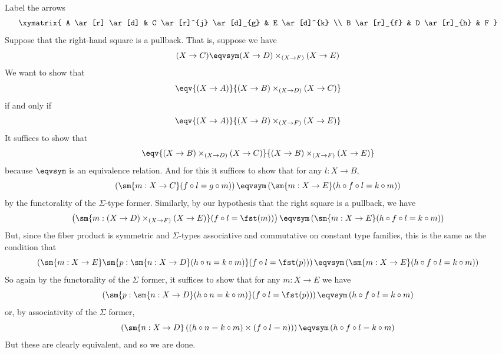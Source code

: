  \soln
Label the arrows
\[\xymatrix{
  A \ar[r] \ar[d] & C \ar[r]^{j} \ar[d]_{g} & E \ar[d]^{k} \\
  B \ar[r]_{f} & D \ar[r]_{h} & F
}\]
Suppose that the right-hand square is a pullback.  That is, suppose we have
\[
  (X \to C) \eqvsym (X \to D) \times_{(X \to F)} (X \to E)
\]
We want to show that
\[
  \eqv{(X \to A)}{(X \to B) \times_{(X \to D)} (X \to C)}
\]
if and only if
\[
  \eqv{(X \to A)}{(X \to B) \times_{(X \to F)} (X \to E)}
\]
It suffices to show that 
\[
  \eqv{(X \to B) \times_{(X \to D)} (X \to C)}{(X \to B) \times_{(X \to F)} (X \to E)}
\]
because $\eqvsym$ is an equivalence relation.  And for this it suffices to show
that for any $l : X \to B$,
\[
  \left(
    \sm{m : X \to C}(f \circ l = g \circ m)
  \right)
  \eqvsym
  \left(
    \sm{m : X \to E}(h \circ f \circ l = k \circ m)
  \right)
\]
by the functorality of the $\Sigma$-type former.  Similarly, by our hypothesis
that the right square is a pullback, we have
\[
  \left(
    \sm{m : (X \to D) \times_{(X \to F)} (X \to E)}(f \circ l = \fst(m))
  \right)
  \eqvsym
  \left(
    \sm{m : X \to E}(h \circ f \circ l = k \circ m)
  \right)
\]
But, since the fiber product is symmetric and $\Sigma$-types associative and
commutative on constant type families, this is the same as the condition that
\[
  \left(
    \sm{m : X \to E} \sm{p : \sm{n : X \to D}(h \circ n = k \circ m)}
        (f \circ l = \fst(p))
  \right)
  \eqvsym
  \left(
    \sm{m : X \to E}(h \circ f \circ l = k \circ m)
  \right)
\]
So again by the functorality of the $\Sigma$ former, it suffices to show that
for any $m : X \to E$ we have
\[
  \left(
    \sm{p : \sm{n : X \to D}(h \circ n = k \circ m)}
        (f \circ l = \fst(p))
  \right)
  \eqvsym
  \left(
    h \circ f \circ l = k \circ m
  \right)
\]
or, by associativity of the $\Sigma$ former,
\[
  \left(
    \sm{n : X \to D}
    \left(
    (h \circ n = k \circ m) \times (f \circ l = n)
    \right)
  \right)
  \eqvsym
  \left(
    h \circ f \circ l = k \circ m
  \right)
\]
But these are clearly equivalent, and so we are done.
